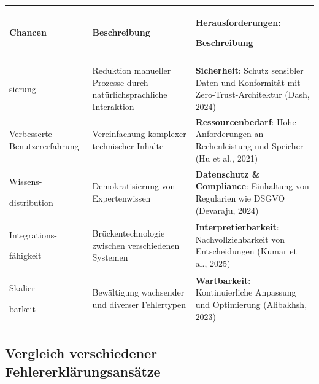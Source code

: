 \documentclass[
  a4paper,
  12pt,
  oneside,
  open=any,
  BCOR=12mm,
  DIV=14,
  parskip=half*,
  headsepline,
  footsepline,
  pointlessnumbers,
  liststotoc,
  numbers=noenddot,
  listof=totoc]{scrartcl}
\begin{document}
\begin{longtable}[]{@{}
  >{\raggedright\arraybackslash}p{}
  >{\raggedright\arraybackslash}p{}
  >{\raggedright\arraybackslash}p{}@{}}
\toprule\noalign{}
\begin{minipage}[b]{\linewidth}\raggedright
\textbf{Chancen}
\end{minipage} & \begin{minipage}[b]{\linewidth}\raggedright
\textbf{Beschreibung}
\end{minipage} & \begin{minipage}[b]{\linewidth}\raggedright
\textbf{Herausforderungen:}

\textbf{Beschreibung}
\end{minipage} \\
\midrule\noalign{}
\endhead
\bottomrule\noalign{}
\endlastfoot
\begin{minipage}[t]{\linewidth}\raggedright
Automati-\\
sierung\strut
\end{minipage} & Reduktion manueller Prozesse durch natürlichsprachliche
Interaktion & \textbf{Sicherheit}: Schutz sensibler Daten und
Konformität mit Zero-Trust-Architektur (Dash, 2024) \\
Verbesserte Benutzererfahrung & Vereinfachung komplexer technischer
Inhalte & \textbf{Ressourcenbedarf}: Hohe Anforderungen an
Rechenleistung und Speicher (Hu et al., 2021) \\
Wissens-

distribution & Demokratisierung von Expertenwissen & \textbf{Datenschutz
\& Compliance}: Einhaltung von Regularien wie DSGVO (Devaraju, 2024) \\
Integrations-

fähigkeit & Brückentechnologie zwischen verschiedenen Systemen &
\textbf{Interpretierbarkeit}: Nachvollziehbarkeit von Entscheidungen
(Kumar et al., 2025) \\
Skalier-

barkeit & Bewältigung wachsender und diverser Fehlertypen &
\textbf{Wartbarkeit}: Kontinuierliche Anpassung und Optimierung
(Alibakhsh, 2023) \\
\end{longtable}

\newpage

\subsection{Vergleich verschiedener
Fehlererklärungsansätze}\label{vergleich-verschiedener-fehlererkluxe4rungsansuxe4tze}
\end{document}
